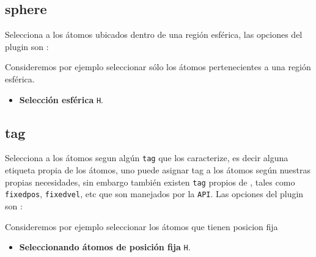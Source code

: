 \subsection{sphere}
Selecciona a los \'atomos ubicados dentro de una regi\'on esf\'erica, las opciones del plugin son :


Consideremos por ejemplo seleccionar s\'olo los \'atomos pertenecientes a una regi\'on esf\'erica.

\begin{itemize}
 \item \textbf{Selecci\'on esf\'erica} \texttt{H}.
\end{itemize}

\subsection{tag}
Selecciona a los \'atomos segun alg\'un \verb|tag| que los caracterize, es decir alguna etiqueta propia de los \'atomos, uno puede asignar tag a los \'atomos seg\'un nuestras propias necesidades, sin embargo tambi\'en existen \verb|tag| propios de {\lpmd}, tales como \verb|fixedpos|, \verb|fixedvel|, etc que son manejados por la \verb|API|. Las opciones del plugin son :


Consideremos por ejemplo seleccionar los \'atomos que tienen posicion fija

\begin{itemize}
 \item \textbf{Seleccionando \'atomos de posici\'on fija} \texttt{H}.
\end{itemize}

